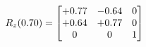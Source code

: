 \documentclass[preview]{standalone}
\begin{document}
\begin{align*}
\special{dvisvgm:raw <g id='unique000'>}R_{z}(0.70) = \begin{bmatrix}+0.77 & -0.64 & 0 \\+0.64 & +0.77 & 0 \\0 & 0 & 1\end{bmatrix}\special{dvisvgm:raw </g>}
\end{align*}
\end{document}
